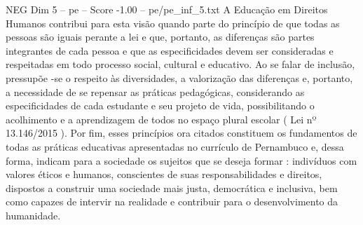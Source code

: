 \begin{textsample}{NEG Dim 5 – pe – Score -1.00 – pe/pe\_inf\_5.txt}
A Educação em Direitos Humanos contribui para esta visão quando parte do princípio de que todas as pessoas são iguais perante a lei e que, portanto, as diferenças são partes integrantes de cada pessoa e que as especificidades devem ser consideradas e respeitadas em todo processo social, cultural e educativo.
Ao se falar de inclusão, pressupõe -se o respeito às diversidades, a valorização das diferenças e, portanto, a necessidade de se repensar as práticas pedagógicas, considerando as especificidades de cada estudante e seu projeto de vida, possibilitando o acolhimento e a aprendizagem de todos no espaço plural escolar ( Lei nº 13.146/2015 ).
Por fim, esses princípios ora citados constituem os fundamentos de todas as práticas educativas apresentadas no currículo de Pernambuco e, dessa forma, indicam para a sociedade os sujeitos que se deseja formar : indivíduos com valores éticos e humanos, conscientes de suas responsabilidades e direitos, dispostos a construir uma sociedade mais justa, democrática e inclusiva, bem como capazes de intervir na realidade e contribuir para o desenvolvimento da humanidade.

\end{textsample}

